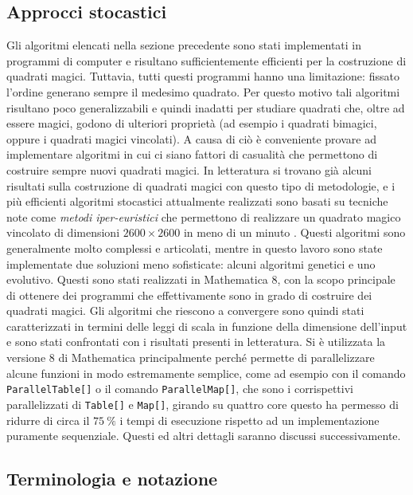 \documentclass[italian,twoside,twocolumn]{article}
\begin{document}
\subsection{Approcci stocastici}
Gli algoritmi elencati nella sezione precedente sono stati implementati in programmi di computer e risultano sufficientemente efficienti per la costruzione di quadrati magici. Tuttavia, tutti questi programmi hanno una limitazione: fissato l'ordine generano sempre il medesimo quadrato. Per questo motivo tali algoritmi risultano poco generalizzabili e quindi inadatti per studiare quadrati che, oltre ad essere magici, godono di ulteriori proprietà (ad esempio i quadrati bimagici, oppure i quadrati magici vincolati). A causa di ciò è conveniente provare ad implementare algoritmi in cui ci siano fattori di casualità che permettono di costruire sempre nuovi quadrati magici. In letteratura si trovano già alcuni risultati sulla costruzione di quadrati magici con questo tipo di metodologie, e i più efficienti algoritmi stocastici attualmente realizzati sono basati su tecniche note come \emph{metodi iper-euristici} che permettono di realizzare un quadrato magico vincolato di dimensioni $ 2600\times 2600 $ in meno di un minuto \cite{AhmedEnder:2014}. Questi algoritmi sono generalmente molto complessi e articolati, mentre in questo lavoro sono state implementate due soluzioni meno sofisticate: alcuni algoritmi genetici e uno evolutivo. Questi sono stati realizzati in Mathematica 8, con la scopo principale di ottenere dei programmi che effettivamente sono in grado di costruire dei quadrati magici. Gli algoritmi che riescono a convergere sono quindi stati caratterizzati in termini delle leggi di scala in funzione della dimensione dell'input e sono stati confrontati con i risultati presenti in letteratura. Si è utilizzata la versione 8 di Mathematica principalmente perché permette di parallelizzare alcune funzioni in modo estremamente semplice, come ad esempio con il comando \texttt{ParallelTable[]} o il comando \texttt{ParallelMap[]}, che sono i corrispettivi parallelizzati di \texttt{Table[]} e \texttt{Map[]}, girando su quattro core questo ha permesso di ridurre di circa il $ \SI{75}{\percent} $ i tempi di esecuzione rispetto ad un implementazione puramente sequenziale. Questi ed altri dettagli saranno discussi successivamente.

\subsection{Terminologia e notazione}
\end{document}
